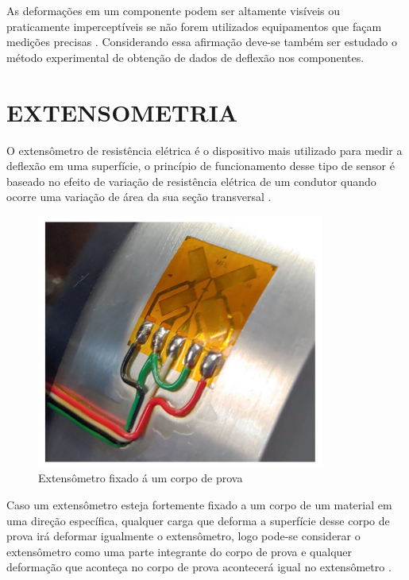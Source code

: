 As deformações em um componente podem ser altamente visíveis ou praticamente imperceptíveis se não forem utilizados equipamentos que façam medições precisas
\autocite{Hibbeler2010}. Considerando essa afirmação deve-se também ser estudado o método experimental de obtenção de dados de deflexão nos componentes.

\section{EXTENSOMETRIA}

O extensômetro de resistência elétrica é o dispositivo mais utilizado para medir a deflexão em uma superfície, o princípio de funcionamento desse tipo de sensor é
baseado no efeito de variação de resistência elétrica de um condutor quando ocorre uma variação de área da sua seção transversal \autocite{Hollman2011}.

\begin{figure}[htb]
	\caption{\label{fig:1080} Extensômetro fixado á um corpo de prova}
	\begin{center}
		\includegraphics[width=\textwidth]{pictures/1080.png}
	\end{center}
\end{figure}

Caso um extensômetro esteja fortemente fixado a um corpo de um material em uma direção específica, qualquer carga que deforma a superfície desse corpo de prova irá
deformar igualmente o extensômetro, logo pode-se considerar o extensômetro como uma parte integrante do corpo de prova e qualquer deformação que aconteça no corpo de
prova acontecerá igual no extensômetro \autocite{Hibbeler2010}.

